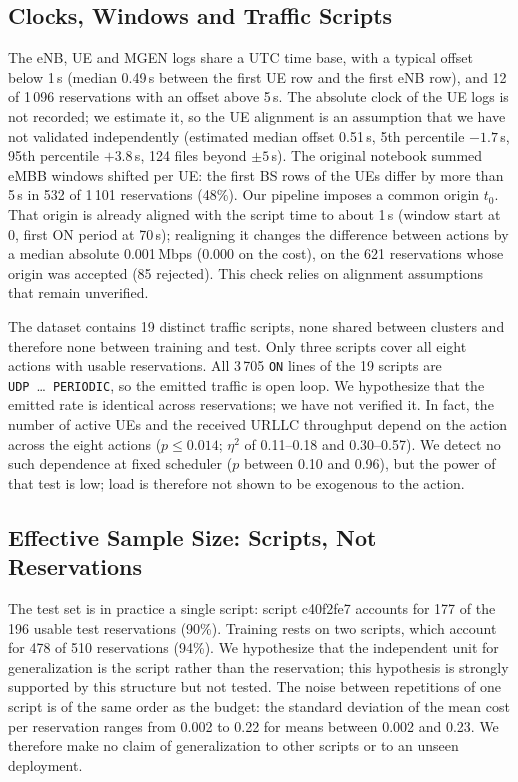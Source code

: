 \subsection{Clocks, Windows and Traffic Scripts}
\label{sec:clocks}

The eNB, UE and MGEN logs share a UTC time base, with a typical offset below 1\,s (median 0.49\,s between the first UE row and the first eNB row), and 12 of 1\,096 reservations with an offset above 5\,s.%
The absolute clock of the UE logs is not recorded; we estimate it, so the UE alignment is an assumption that we have not validated independently (estimated median offset 0.51\,s, 5th percentile $-1.7$\,s, 95th percentile $+3.8$\,s, 124 files beyond $\pm5$\,s).%
The original notebook summed eMBB windows shifted per UE: the first BS rows of the UEs differ by more than 5\,s in 532 of 1\,101 reservations (48\%).%
Our pipeline imposes a common origin $t_0$.%
That origin is already aligned with the script time to about 1\,s (window start at 0, first ON period at 70\,s); realigning it changes the difference between actions by a median absolute 0.001\,Mbps (0.000 on the cost), on the 621 reservations whose origin was accepted (85 rejected).%
This check relies on alignment assumptions that remain unverified.%

The dataset contains 19 distinct traffic scripts, none shared between clusters and therefore none between training and test.%
Only three scripts cover all eight actions with usable reservations.%
All 3\,705 \texttt{ON} lines of the 19 scripts are \texttt{UDP}~\ldots~\texttt{PERIODIC}, so the emitted traffic is open loop.%
We hypothesize that the emitted rate is identical across reservations; we have not verified it.%
In fact, the number of active UEs and the received URLLC throughput depend on the action across the eight actions ($p\le0.014$; $\eta^2$ of 0.11--0.18 and 0.30--0.57).%
We detect no such dependence at fixed scheduler ($p$ between 0.10 and 0.96), but the power of that test is low; load is therefore not shown to be exogenous to the action.%

\subsection{Effective Sample Size: Scripts, Not Reservations}
\label{sec:scripts}

The test set is in practice a single script: script c40f2fe7 accounts for 177 of the 196 usable test reservations (90\%).%
Training rests on two scripts, which account for 478 of 510 reservations (94\%).%
We hypothesize that the independent unit for generalization is the script rather than the reservation; this hypothesis is strongly supported by this structure but not tested.%
The noise between repetitions of one script is of the same order as the budget: the standard deviation of the mean cost per reservation ranges from 0.002 to 0.22 for means between 0.002 and 0.23.%
We therefore make no claim of generalization to other scripts or to an unseen deployment.%

